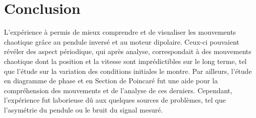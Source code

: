 \documentclass[a4paper,12pt,oneside]{article}
\begin{document}
\section{Conclusion}

L'expérience à permis de mieux comprendre et de visualiser les mouvements chaotique grâce au pendule inversé et au moteur dipolaire. Ceux-ci pouvaient révéler des aspect périodique, qui après analyse, correspondait à des mouvements chaotique dont la position et la vitesse sont imprédictibles sur le long terme, tel que l'étude sur la variation des conditions initiales le montre. Par ailleurs, l'étude en diagramme de phase et en Section de Poincaré fut une aide pour la compréhension des mouvements et de l'analyse de ces derniers.
Cependant, l'expérience fut laborieuse dû aux quelques sources de problèmes, tel que l'asymétrie du pendule ou le bruit du signal mesuré.






\begin{thebibliography}{99}
\end{thebibliography}
\end{document}

